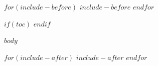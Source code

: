 \documentclass[11pt,a4paper]{article}
\begin{document}
$for(include-before)$
$include-before$
$endfor$

$if(toc)$
\tableofcontents
\clearpage
$endif$

$body$

$for(include-after)$
$include-after$
$endfor$
\end{document}
